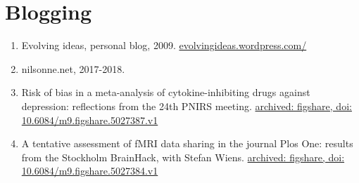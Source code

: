 \documentclass[10pt,a4paper,twocolumn]{article}
\begin{document}
\section{Blogging}
\begin{enumerate}

    \item Evolving ideas, personal blog, 2009. \href{https://evolvingideas.wordpress.com/}{evolvingideas.wordpress.com/}

    \item nilsonne.net, 2017-2018.

    \item Risk of bias in a meta-analysis of cytokine-inhibiting drugs against depression: reflections from the 24th PNIRS meeting. \href{https://doi.org/10.6084/m9.figshare.5027387.v1}{archived: figshare, doi: 10.6084/m9.figshare.5027387.v1}

    \item A tentative assessment of fMRI data sharing in the journal Plos One: results from the Stockholm BrainHack, with Stefan Wiens. \href{https://doi.org/10.6084/m9.figshare.5027384.v1}{archived: figshare, doi: 10.6084/m9.figshare.5027384.v1}

\end{enumerate}
\end{document}
